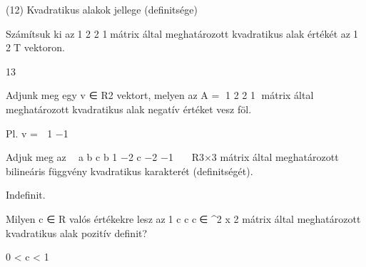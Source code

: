 \begin{frame}[plain]
\begin{tcolorbox}[center, colback={myyellow}, coltext={black}, colframe={myyellow}]
    {\RHuge  (12) Kvadratikus alakok jellege (deﬁnitsége)}
    \mmedskip
\end{tcolorbox}
\end{frame}

\begin{frame}
  \begin{tcolorbox}[title={12/1. -N-}]
     Számítsuk ki az1 2 2 1mátrix által meghatározott kvadratikus alak értékét az1 2T vektoron.

  \tcblower

    \mmedskip 
    
    13
  \end{tcolorbox}
\end{frame}


\begin{frame}
  \begin{tcolorbox}[title={12/2. -R-}]
     Adjunk meg egy v ∈ R2 vektort, melyen az A = 1 2 2 1 mátrix által meghatározott kvadratikus alak negatív értéket vesz föl.


  \tcblower

    \mmedskip 
    
    Pl. v =  1 −1
  \end{tcolorbox}
\end{frame}


\begin{frame}
  \begin{tcolorbox}[title={12/3. -R-}]
     Adjuk meg az 
a b c b 1 −2 c −2 −1
 ∈ R3×3 mátrix által meghatározott bilineáris függvény kvadratikus karakterét (deﬁnitségét).


  \tcblower

    \mmedskip 
    
    Indeﬁnit.
  \end{tcolorbox}
\end{frame}


\begin{frame}
  \begin{tcolorbox}[title={12/4. -N-}]
     Milyen c ∈ R valós értékekre lesz az1 c c c∈ ^{2 x 2} mátrix által meghatározott kvadratikus alak pozitív deﬁnit?

  \tcblower

    \mmedskip 
    
    0 < c < 1
  \end{tcolorbox}
\end{frame}


